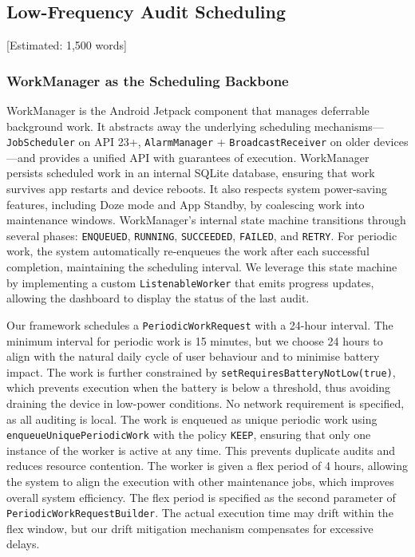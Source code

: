 \subsection{Low-Frequency Audit Scheduling} [Estimated: 1,500 words]

\subsubsection{WorkManager as the Scheduling Backbone}

WorkManager is the Android Jetpack component that manages deferrable background work. It abstracts away the underlying scheduling mechanisms—\texttt{JobScheduler} on API 23+, \texttt{AlarmManager} + \texttt{BroadcastReceiver} on older devices—and provides a unified API with guarantees of execution. WorkManager persists scheduled work in an internal SQLite database, ensuring that work survives app restarts and device reboots. It also respects system power-saving features, including Doze mode and App Standby, by coalescing work into maintenance windows. WorkManager's internal state machine transitions through several phases: \texttt{ENQUEUED}, \texttt{RUNNING}, \texttt{SUCCEEDED}, \texttt{FAILED}, and \texttt{RETRY}. For periodic work, the system automatically re-enqueues the work after each successful completion, maintaining the scheduling interval. We leverage this state machine by implementing a custom \texttt{ListenableWorker} that emits progress updates, allowing the dashboard to display the status of the last audit.

Our framework schedules a \texttt{PeriodicWorkRequest} with a 24-hour interval. The minimum interval for periodic work is 15 minutes, but we choose 24 hours to align with the natural daily cycle of user behaviour and to minimise battery impact. The work is further constrained by \texttt{setRequiresBatteryNotLow(true)}, which prevents execution when the battery is below a threshold, thus avoiding draining the device in low-power conditions. No network requirement is specified, as all auditing is local. The work is enqueued as unique periodic work using \texttt{enqueueUniquePeriodicWork} with the policy \texttt{KEEP}, ensuring that only one instance of the worker is active at any time. This prevents duplicate audits and reduces resource contention. The worker is given a flex period of 4 hours, allowing the system to align the execution with other maintenance jobs, which improves overall system efficiency. The flex period is specified as the second parameter of \texttt{PeriodicWorkRequestBuilder}. The actual execution time may drift within the flex window, but our drift mitigation mechanism compensates for excessive delays.


